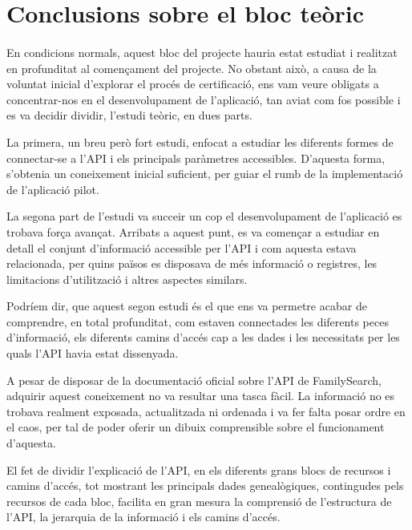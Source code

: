 \section{Conclusions sobre el bloc teòric}

    \paragraph{}

    En condicions normals, aquest bloc del projecte hauria estat estudiat i realitzat en profunditat al començament del projecte. No obstant això, a causa de la voluntat inicial d’explorar el procés de certificació, ens vam veure obligats a concentrar-nos en el desenvolupament de l’aplicació, tan aviat com fos possible i es va decidir dividir, l’estudi teòric, en dues parts.

    La primera, un breu però fort estudi, enfocat a estudiar les diferents formes de connectar-se a l’API i els principals paràmetres accessibles. D’aquesta forma, s’obtenia un coneixement inicial suficient, per guiar el rumb de la implementació de l'aplicació pilot.

    La segona part de l’estudi va succeir un cop el desenvolupament de l’aplicació es trobava força avançat.  Arribats a aquest punt, es va començar a estudiar en detall el conjunt d’informació accessible per l’API i com aquesta estava relacionada, per quins països es disposava de més informació o registres, les limitacions d’utilització i altres aspectes similars.

    Podríem dir, que aquest segon estudi és el que ens va permetre acabar de comprendre, en total profunditat, com estaven connectades les diferents peces d’informació, els diferents camins d’accés cap a les dades i les necessitats per les quals l’API havia estat dissenyada.

    A pesar de disposar de la documentació oficial sobre l'API de FamilySearch, adquirir aquest coneixement no va resultar una tasca fàcil. La informació no es trobava realment exposada, actualitzada ni ordenada i va fer falta posar ordre en el caos, per tal de poder oferir un dibuix comprensible sobre el funcionament d’aquesta.

    El fet de dividir l’explicació de l’API, en els diferents grans blocs de recursos i camins d’accés, tot mostrant les principals dades genealògiques, contingudes pels recursos de cada bloc, facilita en gran mesura la comprensió de l’estructura de l’API, la jerarquia de la informació i els camins d’accés.

